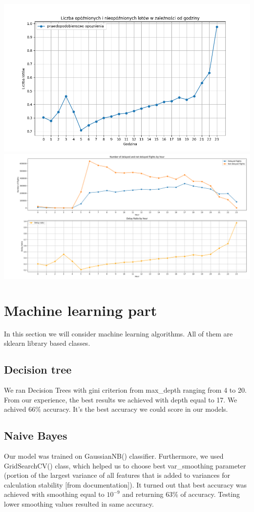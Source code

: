 \documentclass{article}
\begin{document}
	\includegraphics[scale=0.4]{delay_plot}
	\includegraphics[scale=0.25]{delay_plot2}

\newpage

\section{Machine learning part}
In this section we will consider machine learning algorithms. All of them are sklearn library based classes.
\subsection{Decision tree}
We ran Decision Trees with gini criterion from max\_depth ranging from 4 to 20.
From our experience, the best results we achieved with depth equal to 17. We achived 66\% accuracy. It's the best accuracy we could score in our
models.

\subsection{Naive Bayes}
Our model was trained on GaussianNB() classifier. Furthermore, we used GridSearchCV() class, which helped us
to choose best var\_smoothing parameter (portion of the largest variance of all features that is added to variances for calculation stability [from
documentation]). It turned out that best accuracy was achieved with smoothing equal to $10^{-9}$ and returning 63\% of accuracy. Testing lower 
smoothing values resulted in same accuracy.
\end{document}
